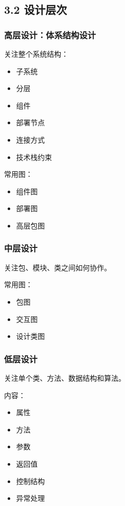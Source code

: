 \documentclass[UTF8,zihao=-4]{ctexart}
\begin{document}
\subsection{3.2 设计层次}

\subsubsection{高层设计：体系结构设计}

关注整个系统结构：

\begin{itemize}
\item 子系统
\item 分层
\item 组件
\item 部署节点
\item 连接方式
\item 技术栈约束
\end{itemize}

常用图：

\begin{itemize}
\item 组件图
\item 部署图
\item 高层包图
\end{itemize}

\subsubsection{中层设计}

关注包、模块、类之间如何协作。

常用图：

\begin{itemize}
\item 包图
\item 交互图
\item 设计类图
\end{itemize}

\subsubsection{低层设计}

关注单个类、方法、数据结构和算法。

内容：

\begin{itemize}
\item 属性
\item 方法
\item 参数
\item 返回值
\item 控制结构
\item 异常处理
\end{itemize}
\end{document}
